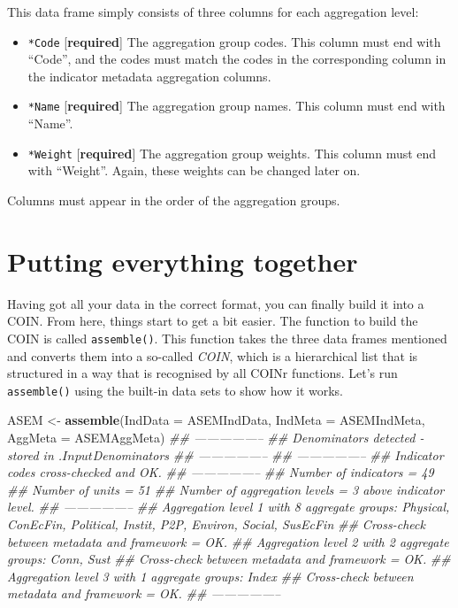 \documentclass[
]{book}
\newenvironment{Shaded}{\begin{snugshade}}{\end{snugshade}}
\newcommand{\CommentTok}[1]{\textcolor[rgb]{0.56,0.35,0.01}{\textit{#1}}}
\newcommand{\DataTypeTok}[1]{\textcolor[rgb]{0.13,0.29,0.53}{#1}}
\newcommand{\KeywordTok}[1]{\textcolor[rgb]{0.13,0.29,0.53}{\textbf{#1}}}
\newcommand{\NormalTok}[1]{#1}
\newcommand{\StringTok}[1]{\textcolor[rgb]{0.31,0.60,0.02}{#1}}
\providecommand{\tightlist}{%
  \setlength{\itemsep}{0pt}\setlength{\parskip}{0pt}}
\begin{document}
This data frame simply consists of three columns for each aggregation level:

\begin{itemize}
\tightlist
\item
  \texttt{*Code} {[}\textbf{required}{]} The aggregation group codes. This column must end with ``Code'', and the codes must match the codes in the corresponding column in the indicator metadata aggregation columns.
\item
  \texttt{*Name} {[}\textbf{required}{]} The aggregation group names. This column must end with ``Name''.
\item
  \texttt{*Weight} {[}\textbf{required}{]} The aggregation group weights. This column must end with ``Weight''. Again, these weights can be changed later on.
\end{itemize}

Columns must appear in the order of the aggregation groups.

\hypertarget{putting-everything-together}{%
\section{Putting everything together}\label{putting-everything-together}}

Having got all your data in the correct format, you can finally build it into a COIN. From here, things start to get a bit easier. The function to build the COIN is called \texttt{assemble()}. This function takes the three data frames mentioned and converts them into a so-called \emph{COIN}, which is a hierarchical list that is structured in a way that is recognised by all COINr functions. Let's run \texttt{assemble()} using the built-in data sets to show how it works.

\begin{Shaded}
\begin{Highlighting}[]
\NormalTok{ASEM <-}\StringTok{ }\KeywordTok{assemble}\NormalTok{(}\DataTypeTok{IndData =}\NormalTok{ ASEMIndData, }\DataTypeTok{IndMeta =}\NormalTok{ ASEMIndMeta, }\DataTypeTok{AggMeta =}\NormalTok{ ASEMAggMeta)}
\CommentTok{## -----------------}
\CommentTok{## Denominators detected - stored in .$Input$Denominators}
\CommentTok{## -----------------}
\CommentTok{## -----------------}
\CommentTok{## Indicator codes cross-checked and OK.}
\CommentTok{## -----------------}
\CommentTok{## Number of indicators = 49}
\CommentTok{## Number of units = 51}
\CommentTok{## Number of aggregation levels = 3 above indicator level.}
\CommentTok{## -----------------}
\CommentTok{## Aggregation level 1 with 8 aggregate groups: Physical, ConEcFin, Political, Instit, P2P, Environ, Social, SusEcFin}
\CommentTok{## Cross-check between metadata and framework = OK.}
\CommentTok{## Aggregation level 2 with 2 aggregate groups: Conn, Sust}
\CommentTok{## Cross-check between metadata and framework = OK.}
\CommentTok{## Aggregation level 3 with 1 aggregate groups: Index}
\CommentTok{## Cross-check between metadata and framework = OK.}
\CommentTok{## -----------------}
\end{Highlighting}
\end{Shaded}
\end{document}
